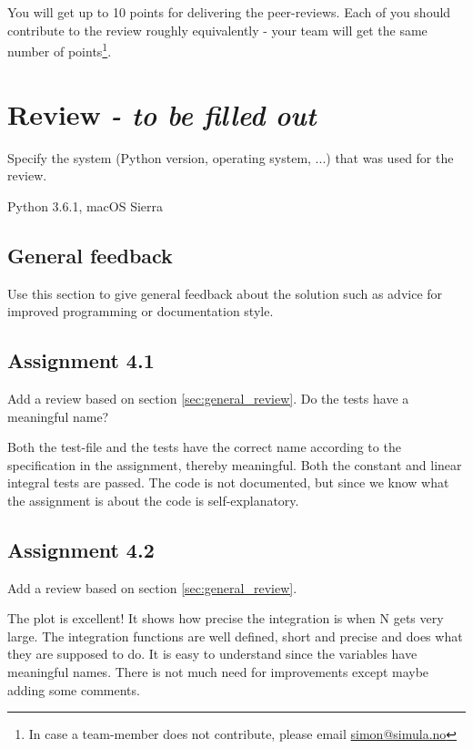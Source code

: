 \documentclass[a4paper]{article}
\begin{document}
You will get up to 10 points for delivering the peer-reviews. Each of you should contribute to the review roughly equivalently - your team will get the same number of points\footnote{In case a team-member does not contribute, please email \href{mailto:simon@simula.no}{simon@simula.no}}. 



\section{Review \emph{- to be filled out}}\label{sec:review}

Specify the system (Python version, operating system, ...) that was used for the review.

Python 3.6.1, macOS Sierra
\subsection*{General feedback}
Use this section to give general feedback about the solution such as advice for improved programming or documentation style.

\subsection*{Assignment 4.1}
Add a review based on section \ref{sec:general_review}. Do the tests have a meaningful name?

Both the test-file and the tests have the correct name according to the specification in the assignment, thereby meaningful. 
Both the constant and linear integral tests are passed. The code is not documented, but since we know what the assignment is about the code is self-explanatory.

\subsection*{Assignment 4.2} \label{sec:assignment5.2}
Add a review based on section \ref{sec:general_review}.

The plot is excellent! It shows how precise the integration is when N gets very  large. The integration functions are well defined, short and precise and does what they are supposed to do. It is easy to understand since the variables have meaningful names.  There is not much need for improvements except maybe adding some comments.
\end{document}
